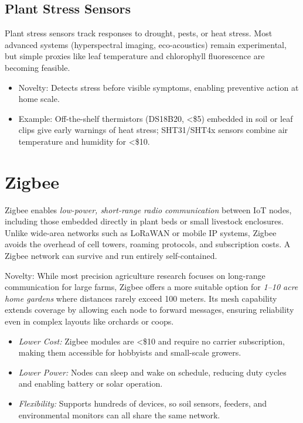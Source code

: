\documentclass{sigchi}
\begin{document}
\subsection{Plant Stress Sensors}
Plant stress sensors track responses to drought, pests, or heat stress. Most advanced systems (hyperspectral imaging, eco-acoustics) remain experimental, but simple proxies like leaf temperature and chlorophyll fluorescence are becoming feasible.
\begin{itemize}
	\item Novelty: Detects stress before visible symptoms, enabling preventive action at home scale.
	\item Example: Off-the-shelf thermistors (DS18B20, <\$5) embedded in soil or leaf clips give early warnings of heat stress; SHT31/SHT4x sensors combine air temperature and humidity for <\$10.
\end{itemize}

\section{Zigbee}

Zigbee enables \emph{low-power, short-range radio communication} between IoT nodes, including those embedded directly in plant beds or small livestock enclosures. Unlike wide-area networks such as LoRaWAN or mobile IP systems, Zigbee avoids the overhead of cell towers, roaming protocols, and subscription costs. A Zigbee network can survive and run entirely self-contained.

Novelty: While most precision agriculture research focuses on long-range communication for large farms, Zigbee offers a more suitable option for \emph{1–10 acre home gardens} where distances rarely exceed 100 meters. Its mesh capability extends coverage by allowing each node to forward messages, ensuring reliability even in complex layouts like orchards or coops.

\begin{itemize}
	\item \emph{Lower Cost:} Zigbee modules are <\$10 and require no carrier subscription, making them accessible for hobbyists and small-scale growers.
	\item \emph{Lower Power:} Nodes can sleep and wake on schedule, reducing duty cycles and enabling battery or solar operation.
	\item \emph{Flexibility:} Supports hundreds of devices, so soil sensors, feeders, and environmental monitors can all share the same network.
\end{itemize}
\end{document}

